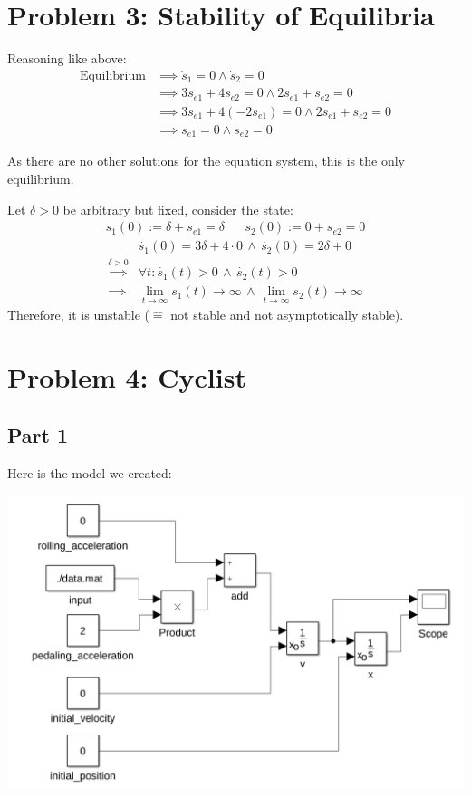 \documentclass[a4paper,parskip,headheight=38pt]{scrartcl} %
\begin{document}
\section*{Problem 3: Stability of Equilibria}

Reasoning like above:
\begin{align*}
\text{Equilibrium}
&\implies \dot{s}_1 = 0 \land \dot{s}_2 = 0 \\
&\implies 3s_{e1} + 4s_{e2} = 0 \land 2s_{e1} + s_{e2} = 0 \\
&\implies 3s_{e1} + 4(-2s_{e1}) = 0 \land 2s_{e1} + s_{e2} = 0 \\
&\implies s_{e1} = 0 \land s_{e2} = 0
\end{align*}

As there are no other solutions for the equation system, this is the only equilibrium.

Let $\delta > 0$ be arbitrary but fixed, consider the state:
\begin{align*}
s_1(0) := \delta + s_{e1} = \delta && s_2(0) := 0 + s_{e2} = 0
\end{align*}
\begin{align*}
& \dot{s_1}(0) = 3 \delta + 4 \cdot 0 \, \land \, \dot{s_2}(0) = 2 \delta + 0 \\
\overset{\delta > 0}{\implies} & \forall t: \dot{s_1}(t) > 0 \, \land \, \dot{s_2}(t) > 0 \\
\implies & \lim_{t \to \infty} s_1(t) \to \infty \, \land \, \lim_{t \to \infty} s_2(t) \to \infty
\end{align*}
Therefore, it is unstable ($\hat{=}$ not stable and not asymptotically stable).

\section*{Problem 4: Cyclist}

\subsection*{Part 1}

Here is the model we created:

\includegraphics[width=\textwidth]{p4a-proof}
\end{document}
